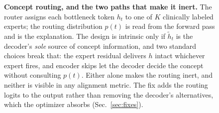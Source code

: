 \begin{figure}[t]
\caption{\textbf{Concept routing, and the two paths that make it inert.} The router
assigns each bottleneck token $h_t$ to one of $K$ clinically labeled experts; the routing
distribution $p(t)$ is read from the forward pass and is the explanation. The design is
intrinsic only if $\tilde h_t$ is the decoder's \emph{sole} source of concept
information, and two standard choices break that: the expert residual delivers $h$ intact
whichever expert fires, and encoder skips let the decoder decide the concept without
consulting $p(t)$. Either alone makes the routing inert, and neither is visible in any
alignment metric. The fix adds the routing logits to the output rather than removing the
decoder's alternatives, which the optimizer absorbs (Sec.~\ref{sec:fixes}).}
\label{fig:arch}
\end{figure}
